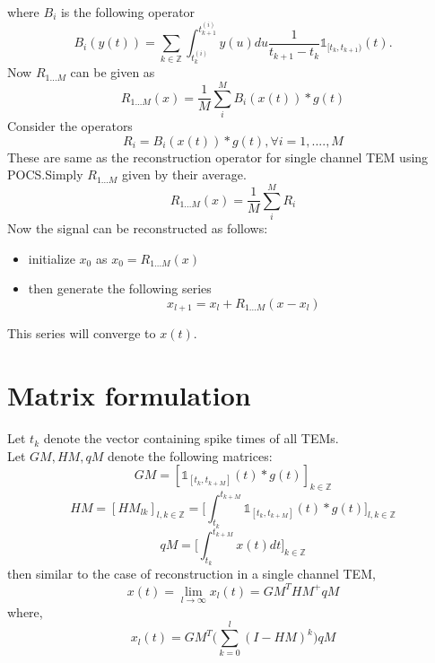 \documentclass{article}
\begin{document}
where $B_i$ is the following operator
\begin{equation}
    B_i(y(t)) = \sum_{k\in\mathbb{Z}}\int_{t_k^(i)}^{t_{k+1}^(i)}y(u)du\frac{1}{t_{k+1}-t_k}\mathds{1}_{[t_k,t_{k+1})}(t).
\end{equation}
Now $R_{1...M}$ can be given as
\begin{equation*}
    R_{1...M}(x) = \frac{1}{M}\sum_{i}^{M}B_i(x(t))*g(t)
\end{equation*}
Consider the operators
\begin{equation*}
    R_i = B_i(x(t))*g(t) , \forall i = 1,....,M
\end{equation*}
These are same as the reconstruction operator for single channel TEM using POCS.Simply $R_{1...M}$ given by their average.
\begin{equation}
    R_{1...M}(x) = \frac{1}{M}\sum_{i}^{M}R_i
\end{equation}
Now the signal can be reconstructed as follows:
\begin{itemize}
    \item initialize $x_0$ as $x_0 = R_{1...M}(x)$
    \item then generate the following series
    \begin{equation}
        x_{l+1} = x_l + R_{1...M}(x-x_l)
    \end{equation}
\end{itemize}
This series will converge to $x(t)$.
\section{Matrix formulation}
Let $t_k^{~}$ denote the vector containing spike times of all TEMs.\\
Let $GM,HM,qM$ denote the following matrices:
\begin{equation}
    GM = [\mathds{1}_{[t_k^{~},t_{k+M}^{~}]}(t)*g(t)]_{k\in\mathbb{Z}}
\end{equation}
\begin{equation}
    HM = [HM_{lk}]_{l,k\in\mathbb{Z}} = \Big[\int_{t_k^{~}}^{t_{k+M}^{~}}\mathds{1}_{[t_k^{~},t_{k+M}^{~}]}(t)*g(t)\Big]_{l,k\in\mathbb{Z}}
\end{equation}
\begin{equation}
    qM = \Big[\int_{t_k^{~}}^{t_{k+M}^{~}}x(t)dt\Big]_{k\in\mathbb{Z}}
\end{equation}
then similar to the case of reconstruction in a single channel TEM,
\begin{equation}
    x(t) = \lim_{l\to\infty} x_l(t) = GM^THM^+qM
\end{equation}
where,
\begin{equation}
    x_l(t) = GM^T\Big(\sum_{k=0}^l(I-HM)^k\Big)qM
\end{equation}
\end{document}
